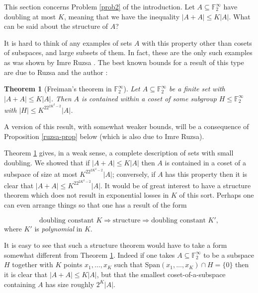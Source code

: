 \documentclass[12pt,a4paper,reqno]{amsart}
\numberwithin{equation}{section}
\theoremstyle{plain}
\newtheorem{theorem}[subsection]{Theorem}
\theoremstyle{definition}
\renewcommand{\leq}{\leqslant}
\begin{document}
\noindent This section concerns Problem \ref{prob2} of the introduction. Let $A \subseteq \mathbb{F}_2^{\infty}$ have doubling at most $K$, meaning that we have the inequality $|A + A| \leq K|A|$. What can be said about the structure of $A$?\vspace{11pt}

\noindent It is hard to think of any examples of sets $A$ with this property other than cosets of subspaces, and large subsets of them. In fact, these are the only such examples as was shown by Imre Ruzsa \cite{ruzsa-freimangroups}. The best known bounds for a result of this type are due to Ruzsa and the author \cite{green-ruzsa3}:

\begin{theorem}[Freiman's theorem in $\mathbb{F}_2^{\infty}$]\label{freiman-torsion} Let $A \subseteq \mathbb{F}_2^{\infty}$ be a finite set with $|A + A| 
\leq K|A|$. Then $A$ is contained within a coset of some subgroup $H \leq \mathbb{F}_2^{\infty}$
with $|H| \leq K^22^{2K^2 -2}|A|$.
\end{theorem}
\noindent A version of this result, with somewhat weaker bounds, will be a consequence of Proposition \ref{ruzsa-prop} below (which is also due to Imre Ruzsa). \vspace{11pt}

\noindent Theorem \ref{freiman-torsion} gives, in a weak sense, a complete description of sets with small doubling. We showed that if $|A + A| \leq K|A|$ then $A$ is contained in a coset of a subspace of size at most $K^22^{2K^2-2}|A|$; conversely, if $A$ has this property then it is clear that $|A + A| \leq K^22^{2K^2 - 2}|A|$. It would be of great interest to have a structure theorem which does not result in exponential losses in $K$ of this sort. Perhaps one can even arrange things so that one has a result of the form

\[ \mbox{doubling constant $K$} \Longrightarrow \mbox{structure} \Longrightarrow \mbox{doubling constant $K'$}, \] where $K'$ is \textit{polynomial} in $K$.\vspace{11pt}

\noindent It is easy to see that such a structure theorem would have to take a form somewhat different from Theorem \ref{freiman-torsion}. Indeed if one takes $A \subseteq \mathbb{F}_2^{\infty}$ to be a subspace $H$ together with $K$ points $x_1,\dots,x_K$ such that $\mbox{Span}(x_1,\dots,x_K) \cap H = \{0\}$ then it is clear that $|A + A| \leq K|A|$, but that the smallest coset-of-a-subspace containing $A$ has size roughly $2^K|A|$.\vspace{11pt}
\end{document}
